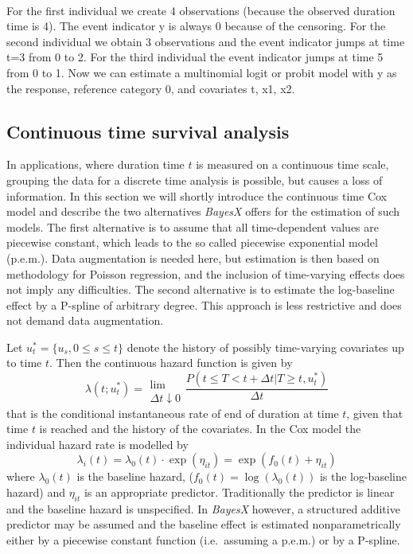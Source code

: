 \documentclass[11pt,a4paper,twoside]{bayesxarticle}
\begin{document}
\vspace{0.5cm}\\
For the first individual we create 4 observations (because the
observed duration time is 4). The event indicator y is always 0
because of the censoring. For the second individual we obtain 3
observations and the event indicator jumps at time t=3 from 0 to
2. For the third individual the event indicator jumps at time 5
from 0 to 1. Now we can estimate a multinomial logit or probit
model with y as the response, reference category 0, and covariates
t, x1, x2.


\subsection{Continuous time survival analysis}
\label{continuoustime}

In applications, where duration time $t$ is measured on a
continuous time scale, grouping the data for a discrete time
analysis is possible, but causes a loss of information. In this
section we will shortly introduce the continuous time Cox model
and describe the two alternatives \textit{BayesX} offers for the
estimation of such models. The first alternative is to assume that
all time-dependent values are piecewise constant, which leads to
the so called piecewise exponential model (p.e.m.). Data
augmentation is needed here, but estimation is then based on
methodology for Poisson regression, and the inclusion of
time-varying effects does not imply any difficulties. The second
alternative is to estimate the log-baseline effect by a P-spline
of arbitrary degree. This approach is less restrictive and does
not demand data augmentation.

Let $u_t^{*}=\{u_s,0 \le s \le t\}$ denote the history of possibly
time-varying covariates up to time $t$. Then the continuous hazard
function is given by
\[
\lambda(t;u_t^{*})=\begin{array}{c}\\\mbox{lim}\\{\Delta t
\downarrow 0}\end{array}\frac{P(t \le T< t+\Delta t | T\ge t,
u_t^{*})}{\Delta t}
\]
that is the conditional instantaneous rate of end of duration at
time $t$, given that time $t$ is reached and the history of the
covariates. In the Cox model the individual hazard rate is
modelled by
\begin{equation}\label{CoxModel}
\lambda_i(t)=\lambda_0(t)\cdot
\exp(\eta_{it})=\exp(f_0(t)+\eta_{it})
\end{equation}
where $\lambda_0(t)$ is the baseline hazard,
($f_0(t)=\log(\lambda_0(t))$ is the log-baseline hazard) and
$\eta_{it}$ is an appropriate predictor. Traditionally the
predictor is linear and the baseline hazard is unspecified. In
\textit{BayesX} however, a structured additive predictor may be
assumed and the baseline effect is estimated nonparametrically
either by a piecewise constant function (i.e.~assuming a p.e.m.)
or by a P-spline.
\end{document}
